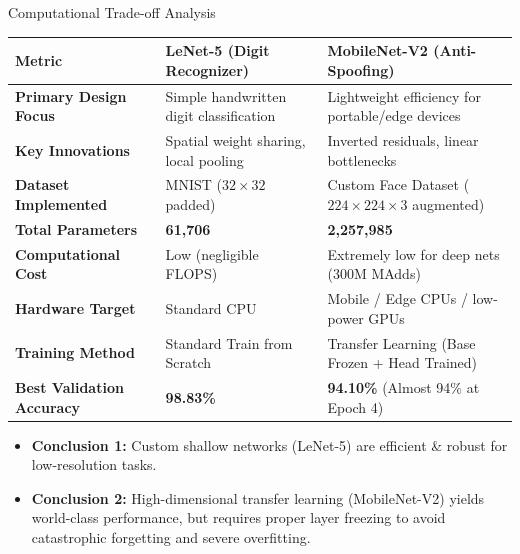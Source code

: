 \documentclass[aspectratio=169, 10pt]{beamer}
\begin{document}
\begin{frame}{Computational Trade-off Analysis}
    \centering
    \small
    \begin{tabular}{lll}
        \toprule
        \textbf{Metric} & \textbf{LeNet-5 (Digit Recognizer)} & \textbf{MobileNet-V2 (Anti-Spoofing)} \\
        \midrule
        \textbf{Primary Design Focus} & Simple handwritten digit classification & Lightweight efficiency for portable/edge devices \\
        \textbf{Key Innovations} & Spatial weight sharing, local pooling & Inverted residuals, linear bottlenecks \\
        \textbf{Dataset Implemented} & MNIST ($32\times32$ padded) & Custom Face Dataset ($224\times224\times3$ augmented) \\
        \textbf{Total Parameters} & \textbf{61,706} & \textbf{2,257,985} \\
        \textbf{Computational Cost} & Low (negligible FLOPS) & Extremely low for deep nets (300M MAdds) \\
        \textbf{Hardware Target} & Standard CPU & Mobile / Edge CPUs / low-power GPUs \\
        \textbf{Training Method} & Standard Train from Scratch & Transfer Learning (Base Frozen + Head Trained) \\
        \textbf{Best Validation Accuracy} & \textbf{98.83\%} & \textbf{94.10\%} (Almost 94\% at Epoch 4) \\
        \bottomrule
    \end{tabular}
    \normalsize
    \vspace{0.4cm}
    \begin{itemize}
        \item \textbf{Conclusion 1:} Custom shallow networks (LeNet-5) are efficient & robust for low-resolution tasks.
        \item \textbf{Conclusion 2:} High-dimensional transfer learning (MobileNet-V2) yields world-class performance, but requires proper layer freezing to avoid catastrophic forgetting and severe overfitting.
    \end{itemize}
\end{frame}
\end{document}
